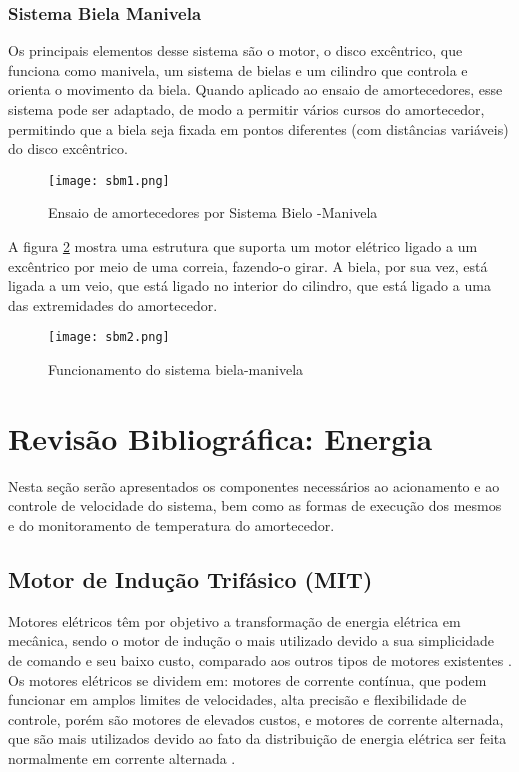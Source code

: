 			\subsubsection{Sistema Biela Manivela}

				Os principais elementos desse sistema são o motor, o disco excêntrico, que funciona como manivela, um sistema de bielas e um cilindro que controla e orienta o movimento da biela. Quando aplicado ao ensaio de amortecedores, esse sistema pode ser adaptado, de modo a permitir vários cursos do amortecedor, permitindo que a biela seja fixada em pontos diferentes (com distâncias variáveis) do disco excêntrico.

				\begin{figure}[!h]
					\centering
					\texttt{[image: sbm1.png]}
					\caption[Ensaio de amortecedores por Sistema Bielo -Manivela]{Ensaio de amortecedores por Sistema Bielo -Manivela \cite{Dixion}} 
					\label{sbm1}
				\end{figure}

				A figura \ref{sbm2} mostra uma estrutura que suporta um motor elétrico ligado a um excêntrico por meio de uma correia, fazendo-o girar. A biela, por sua vez, está ligada a um veio, que está ligado no interior do cilindro, que está ligado a uma das extremidades do amortecedor.

				\begin{figure}[!h]
					\centering
					\texttt{[image: sbm2.png]}
					\caption[Funcionamento do Sistema Biela-Manivela]{Funcionamento do sistema biela-manivela \cite{Dixion}} 
					\label{sbm2}
				\end{figure}

	\newpage
	\section{Revisão Bibliográfica: Energia}

	Nesta seção serão apresentados os componentes necessários ao acionamento e ao controle de velocidade do sistema, bem como as formas de execução dos mesmos e do monitoramento de temperatura do amortecedor.

		\subsection{Motor de Indução Trifásico (MIT)}

			Motores elétricos têm por objetivo a transformação de energia elétrica em mecânica, sendo o motor de indução o mais utilizado devido a sua simplicidade de comando e seu baixo custo, comparado aos outros tipos de motores existentes \cite{Alexander}. Os motores elétricos se dividem em: motores de corrente contínua, que podem funcionar em amplos limites de velocidades, alta precisão e flexibilidade de controle, porém são motores de elevados custos, e motores de corrente alternada, que são mais utilizados devido ao fato da distribuição de energia elétrica ser feita normalmente em corrente alternada \cite{WEGMotorEletrico}.

